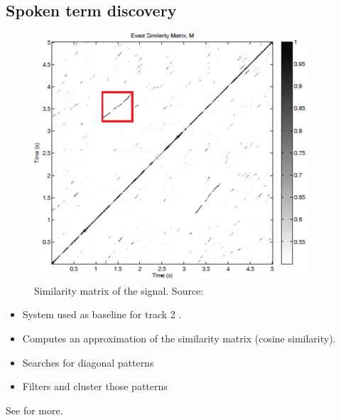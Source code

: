 \documentclass[final]{beamer}
\begin{document}
\begin{frame}[t]
\begin{multicols}{2}

\subsection{Spoken term discovery}

\begin{multicols}{2} %

\begin{figure}
  \begin{center}
    \includegraphics[width=0.4\columnwidth]{similarity_matrix}
  \end{center}
  \caption{\label{fig:system}Similarity matrix of the signal. Source: \cite{jansenvandurme2011}}
\end{figure}
\columnbreak

\begin{itemize}
\item System used as baseline for track 2 \cite{versteeghetal2015}.
\item Computes an approximation of the similarity matrix (cosine similarity).
\item Searches for diagonal patterns
\item Filters and cluster those patterns
\end{itemize}
See \cite{jansenvandurme2011} for more.

\end{multicols}



\end{multicols}
\end{frame}
\end{document}
